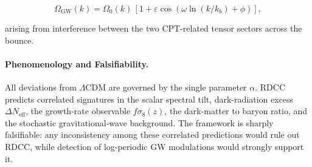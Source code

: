 \documentclass[11pt,a4paper]{article}
\begin{document}
\[
\Omega_{\mathrm{GW}}(k)
    = \Omega_{0}(k)\,
      \left[1 + \varepsilon \cos\!\left(\omega \ln(k/k_{b}) + \phi\right)\right],
\]


arising from interference between the two CPT-related tensor sectors across the
bounce.

\paragraph{Phenomenology and Falsifiability.}
All deviations from \(\Lambda\)CDM are governed by the single parameter
\(\alpha\). RDCC predicts correlated signatures in the scalar spectral tilt,
dark-radiation excess \(\Delta N_{\mathrm{eff}}\), the growth-rate observable
\(f\sigma_{8}(z)\), the dark-matter to baryon ratio, and the stochastic
gravitational-wave background. The framework is sharply falsifiable: any
inconsistency among these correlated predictions would rule out RDCC, while
detection of log-periodic GW modulations would strongly support it.

\clearpage
\end{document}

